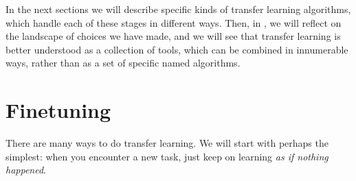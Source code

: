 
In the next sections we will describe specific kinds of transfer learning algorithms, which handle each of these stages in different ways. Then, in \sect{\ref{sec:transfer_learning:combinatorial_catalog}}, we will reflect on the landscape of choices we have made, and we will see that transfer learning is better understood as a collection of tools, which can be combined in innumerable ways, rather than as a set of specific named algorithms.%



\section{Finetuning}

There are many ways to do transfer learning. We will start with perhaps the simplest: when you encounter a new task, just keep on learning \emph{as if nothing happened}.

